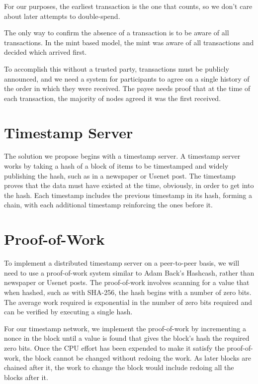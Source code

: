 \documentclass{article}
\begin{document}
For our purposes, the earliest transaction is the one that counts, so we don't care about later attempts to double-spend.

The only way to confirm the absence of a transaction is to be aware of all transactions. In the mint based model, the mint was aware of all transactions and decided which arrived first.

To accomplish this without a trusted party, transactions must be publicly announced, and we need a system for participants to agree on a single history of the order in which they were received. The payee needs proof that at the time of each transaction, the majority of nodes agreed it was the first received.

\section{Timestamp Server}
The solution we propose begins with a timestamp server. A timestamp server works by taking a hash of a block of items to be timestamped and widely publishing the hash, such as in a newspaper or Usenet post. The timestamp proves that the data must have existed at the time, obviously, in order to get into the hash. Each timestamp includes the previous timestamp in its hash, forming a chain, with each additional timestamp reinforcing the ones before it.

\section{Proof-of-Work}
To implement a distributed timestamp server on a peer-to-peer basis, we will need to use a proof-of-work system similar to Adam Back's Hashcash, rather than newspaper or Usenet posts. The proof-of-work involves scanning for a value that when hashed, such as with SHA-256, the hash begins with a number of zero bits. The average work required is exponential in the number of zero bits required and can be verified by executing a single hash.

For our timestamp network, we implement the proof-of-work by incrementing a nonce in the block until a value is found that gives the block's hash the required zero bits. Once the CPU effort has been expended to make it satisfy the proof-of-work, the block cannot be changed without redoing the work. As later blocks are chained after it, the work to change the block would include redoing all the blocks after it.
\end{document}
